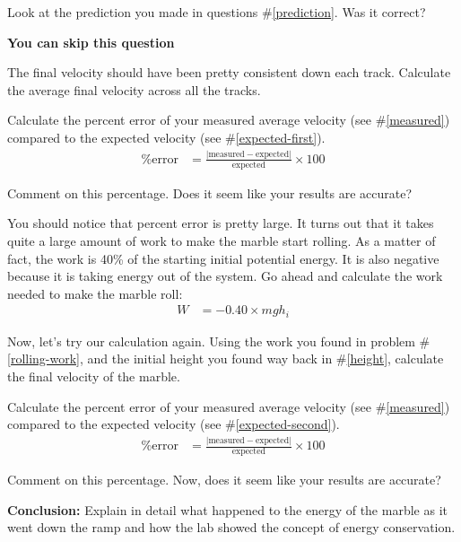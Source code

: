 \documentclass[10pt]{exam}
\begin{document}
\begin{questions}

\question
  Look at the prediction you made in questions \#\ref{prediction}. Was it correct? 

  \begin{solution}[\stretch{1}]
    {\color{red} \bf You can skip this question}
  \end{solution}
 
\question \label{measured}
  The final velocity should have been pretty consistent down each track.  Calculate the average final velocity across all the tracks.


\question
  Calculate the percent error of your measured average velocity (see \#\ref{measured}) compared to the expected velocity (see \#\ref{expected-first}).
  \begin{align*}
    \text{\% error} &=  
    \frac{
      \left|\text{measured}-\text{expected}\right|
      }{
        \text{expected}
      } 
    \times 100
  \end{align*}
  \vs 

\question
  Comment on this percentage.  Does it seem like your results are accurate?
  \vs 

\question \label{rolling-work}
  You should notice that percent error is pretty large.  It turns out that it takes quite a large amount of work to make the marble start rolling.  As a matter of fact, the work is 40\% of the starting initial potential energy.  It is also negative because it is taking energy out of the system.  Go ahead and calculate the work needed to make the marble roll:
  \begin{align*}
    W &= -0.40 \times mgh_i
  \end{align*}
  \vs  

\pagebreak


\question \label{expected-second}
  Now, let's try our calculation again.  Using the work you found in problem \#\ref{rolling-work}, and the initial height you found way back in \#\ref{height}, calculate the final velocity of the marble.
  \vs[2] 


\question 
  Calculate the percent error of your measured average velocity (see \#\ref{measured}) compared to the expected velocity (see \#\ref{expected-second}).
  \begin{align*}
    \text{\% error} &=  
    \frac{
      \left|\text{measured}-\text{expected}\right|
      }{
        \text{expected}
      } 
    \times 100
  \end{align*}
  \vs 

\question
  Comment on this percentage.  Now, does it seem like your results are accurate?
  \vs 

\question
  {\bf Conclusion:} Explain in detail what happened to the energy of the marble as it went down the ramp and how the lab showed the concept of energy conservation.
  \vs


\end{questions}
\end{document}
